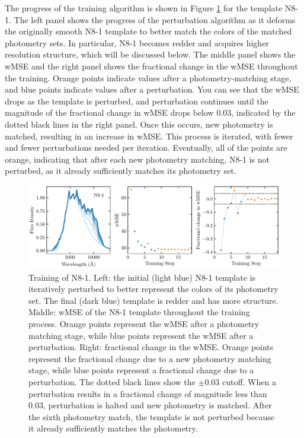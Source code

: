\documentclass[twocolumn]{aastex63}
\begin{document}
    The progress of the training algorithm is shown in Figure \ref{fig:training} for the template N8-1.
    The left panel shows the progress of the perturbation algorithm as it deforms the originally smooth N8-1 template to better match the colors of the matched photometry sets.
    In particular, N8-1 becomes redder and acquires higher resolution structure, which will be discussed below.
    The middle panel shows the wMSE and the right panel shows the fractional change in the wMSE throughout the training.
    Orange points indicate values after a photometry-matching stage, and blue points indicate values after a perturbation.
    You can see that the wMSE drops as the template is perturbed, and perturbation continues until the magnitude of the fractional change in wMSE drops below 0.03, indicated by the dotted black lines in the right panel.
    Once this occurs, new photometry is matched, resulting in an increase in wMSE.
    This process is iterated, with fewer and fewer perturbations needed per iteration.
    Eventually, all of the points are orange, indicating that after each new photometry matching, N8-1 is not perturbed, as it already sufficiently matches its photometry set.

    \begin{figure}
        \centering
        \includegraphics{N8_1_training_history.pdf}
        \caption{Training of N8-1. Left: the initial (light blue) N8-1 template is iteratively perturbed to better represent the colors of its photometry set. The final (dark blue) template is redder and has more structure. Middle: wMSE of the N8-1 template throughout the training process. Orange points represent the wMSE after a photometry matching stage, while blue points represent the wMSE after a perturbation. Right: fractional change in the wMSE. Orange points represent the fractional change due to a new photometry matching stage, while blue points represent a fractional change due to a perturbation. The dotted black lines show the $\pm 0.03$ cutoff. When a perturbation results in a fractional change of magnitude less than 0.03, perturbation is halted and new photometry is matched. After the sixth photometry match, the template is not perturbed because it already sufficiently matches the photometry.}
        \label{fig:training}
    \end{figure}
\end{document}
